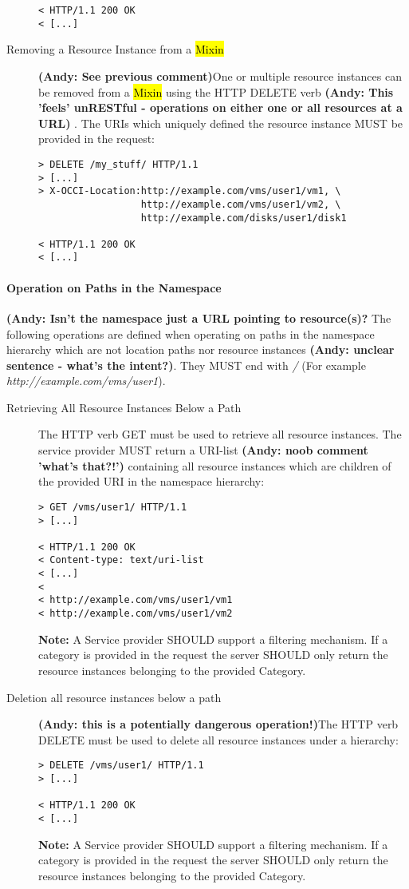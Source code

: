 \documentclass[10pt,a4paper]{article}
\begin{document}
\begin{description}
\begin{verbatim}
< HTTP/1.1 200 OK
< [...]
\end{verbatim}

\item[Removing a Resource Instance from a \hl{Mixin}] 
\textbf{(Andy: See previous comment)}One or multiple
  resource instances can be removed from a \hl{Mixin} using the HTTP
  DELETE verb 
  \textbf{(Andy: This 'feels' unRESTful - operations on either one or all resources at a URL)}
  . The URIs which uniquely defined the resource instance
  MUST be provided in the request:
\begin{verbatim}
> DELETE /my_stuff/ HTTP/1.1
> [...]
> X-OCCI-Location:http://example.com/vms/user1/vm1, \
                  http://example.com/vms/user1/vm2, \
                  http://example.com/disks/user1/disk1

< HTTP/1.1 200 OK
< [...]
\end{verbatim}
\end{description}

\paragraph{Operation on Paths in the Namespace}
\textbf{(Andy: Isn't the namespace just a URL pointing to resource(s)?}
The following operations are defined when operating on paths in the
namespace hierarchy which are not location paths nor resource
instances \textbf{(Andy: unclear sentence - what's the intent?)}. 
They MUST end with \emph{/} (For example
\emph{http://example.com/vms/user1}).

\begin{description}
\item[Retrieving All Resource Instances Below a Path] The HTTP verb
  GET must be used to retrieve all resource instances. The service
  provider MUST return a URI-list \textbf{(Andy: noob comment 'what's that?!')} 
  containing all resource instances
  which are children of the provided URI in the namespace hierarchy:
\begin{verbatim}
> GET /vms/user1/ HTTP/1.1
> [...]
 
< HTTP/1.1 200 OK
< Content-type: text/uri-list
< [...]
< 
< http://example.com/vms/user1/vm1
< http://example.com/vms/user1/vm2
\end{verbatim}
\textbf{Note:} A Service provider SHOULD support a filtering
mechanism. If a category is provided in the request the server SHOULD
only return the resource instances belonging to the provided
Category.

\item[Deletion all resource instances below a path] 
\textbf{(Andy: this is a potentially dangerous operation!)}The HTTP verb
  DELETE must be used to delete all resource instances under a
  hierarchy:
\begin{verbatim}
> DELETE /vms/user1/ HTTP/1.1
> [...]
 
< HTTP/1.1 200 OK
< [...]
\end{verbatim}
\textbf{Note:} A Service provider SHOULD support a filtering
mechanism. If a category is provided in the request the server SHOULD
only return the resource instances belonging to the provided
Category.
\end{description}
\end{document}
